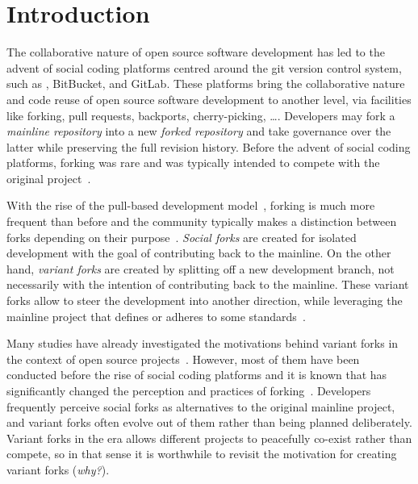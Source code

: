 \section{Introduction}
\label{sec:intro}

The collaborative nature of open source software development has led to the advent of social coding platforms centred around the git version control system, such as \gh, BitBucket, and GitLab.
These platforms bring the collaborative nature and code reuse of open source software development to another level, via facilities like forking, pull requests, backports, cherry-picking, \ldots.
Developers may fork a \textit{mainline repository} into a new \textit{forked repository} and take governance over the latter while preserving the full revision history.
Before the advent of social coding platforms, forking was rare and was typically intended to compete with the original project~\cite{Linus:2012Perspectives,Gregorio:2012,Viseur:2012Forks,Linus:2013CodeForking,Linus:2011ToFork,Gamalielsson:2014Sustainability}.

With the rise of the pull-based development model~\cite{Gousios:2014ICSE}, forking is much more frequent than before and the community typically makes a distinction between forks depending on their purpose~\cite{Zhou:2020}.
\textit{Social forks} are created for isolated development with the goal of contributing back to the mainline.
On the other hand, \textit{variant forks} are created by splitting off a new development branch, not necessarily with the intention of contributing back to the mainline.
These variant forks allow to steer the development into another direction, while leveraging the mainline project that defines or adheres to some standards~\cite{sung:ICSE:2020}.

Many studies have already investigated the motivations behind variant forks in the context of open source projects~\cite{Linus:2012Perspectives,Gregorio:2012,Viseur:2012Forks,Linus:2013CodeForking,Linus:2011ToFork,Gamalielsson:2014Sustainability}.
However, most of them have been conducted before the rise of social coding platforms and it is known that \gh has significantly changed the perception and practices of forking~\cite{Zhou:2020}.
Developers frequently perceive social forks as alternatives to the original mainline project, and variant forks often evolve out of them rather than being planned deliberately.
Variant forks in the \gh era allows different projects to peacefully co-exist rather than compete, so in that sense it is worthwhile to revisit the motivation for creating variant forks (\textit{why?}).

